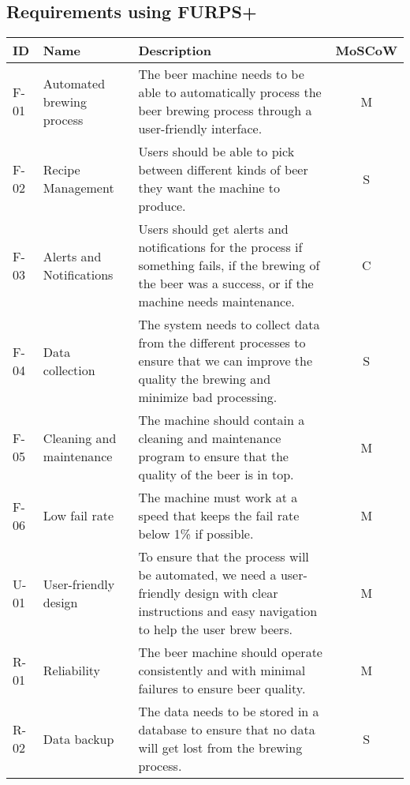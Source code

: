 \subsection{Requirements using FURPS+}
\begin{center}
    \sloppy
    \begin{longtable}{|p{1cm}|p{4cm}|p{8.5cm}|c|}
        \hline
        ID & Name & Description & MoSCoW \\ \hline
        F-01   & Automated brewing process  & The beer machine needs to be able to automatically process the beer brewing process through a user-friendly interface.                                        & M \\ \hline
        F-02   & Recipe Management          & Users should be able to pick between different kinds of beer they want the machine to produce.                                                                & S \\ \hline                                                          
        F-03   & Alerts and Notifications   & Users should get alerts and notifications for the process if something fails, if the brewing of the beer was a success, or if the machine needs maintenance.  & C \\ \hline
        F-04   & Data collection            & The system needs to collect data from the different processes to ensure that we can improve the quality the brewing and minimize bad processing.              & S \\ \hline
        F-05   & Cleaning and maintenance   & The machine should contain a cleaning and maintenance program to ensure that the quality of the beer is in top.                                               & M \\ \hline
        F-06   & Low fail rate              & The machine must work at a speed that keeps the fail rate below 1\% if possible.                                                                              & M \\ \hline
        U-01   & User-friendly design       & To ensure that the process will be automated, we need a user-friendly design with clear instructions and easy navigation to help the user brew beers.         & M \\ \hline
        R-01   & Reliability                & The beer machine should operate consistently and with minimal failures to ensure beer quality.                                                                & M \\ \hline
        R-02   & Data backup                & The data needs to be stored in a database to ensure that no data will get lost from the brewing process.                                                      & S \\ \hline

\end{longtable}
\end{center}
